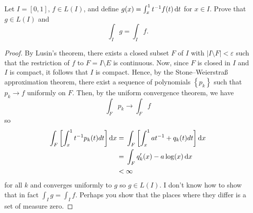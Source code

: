 \begin{problem}
Let $I=[0,1]$, $f\in L(I)$, and define $g(x)=\int_x^1
t^{-1}f(t) \mathop{}\!\mathrm{d} t$ for $x\in I$. Prove that $g\in L(I)$ and
\[
\int_I g=\int_I f.
\]
\end{problem}
\begin{proof}
By Lusin's theorem, there exists a closed subset $F$ of $I$ with $|I\setminus
F|<\varepsilon$ such that the restriction of $f$ to $F= I\setminus E$
is continuous. Now, since $F$ is closed in $I$ and $I$ is compact, it
follows that $I$ is compact. Hence, by the Stone--Weierstraß approximation
theorem, there exist a sequence of polynomials $\left\{ p_k \right\}$ such
that $p_k\to f$ uniformly on $F$. Then, by the uniform convergence theorem,
we have
\begin{equation}
  \label{eq:uniform-convergence-2-4}
\int_F p_k\longrightarrow \int_F f
\end{equation}
so
\begin{equation}
  \label{eq:uniform-convergence-2-2-4}
\begin{aligned}
\int_F\left[\int_x^1t^{-1}p_k(t) d  t\right]\mathop{}\!\mathrm{d} x
={}&\int_F\left[\int_x^1 at^{-1}+q_k(t) d  t\right]\mathop{}\!\mathrm{d} x\\
={}&\int_F q_k'(x)-a\log(x)\mathop{}\!\mathrm{d} x\\
<{}&\infty
\end{aligned}
\end{equation}
for all $k$ and converges uniformly to $g$ so $g\in L(I)$. I don't know
how to show that in fact $\int_I g=\int_I f$. Perhaps you show that the
places where they differ is a set of measure zero.
\end{proof}

